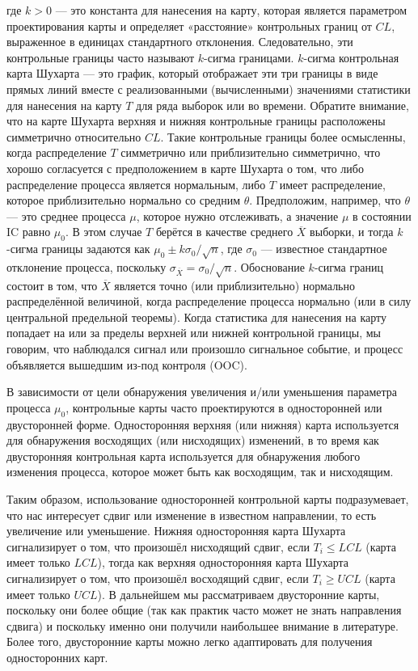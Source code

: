 где \(k > 0\) — это константа для нанесения на карту, которая является параметром проектирования карты и определяет «расстояние» контрольных границ от \(CL\), выраженное в единицах стандартного отклонения. Следовательно, эти контрольные границы часто называют \(k\)-сигма границами. \(k\)-сигма контрольная карта Шухарта — это график, который отображает эти три границы в виде прямых линий вместе с реализованными (вычисленными) значениями статистики для нанесения на карту \(T\) для ряда выборок или во времени. Обратите внимание, что на карте Шухарта верхняя и нижняя контрольные границы расположены симметрично относительно \(CL\). Такие контрольные границы более осмысленны, когда распределение \(T\) симметрично или приблизительно симметрично, что хорошо согласуется с предположением в карте Шухарта о том, что либо распределение процесса является нормальным, либо \(T\) имеет распределение, которое приблизительно нормально со средним \(\theta\). Предположим, например, что \(\theta\) — это среднее процесса \(\mu\), которое нужно отслеживать, а значение \(\mu\) в состоянии IC равно \(\mu_0\). В этом случае \(T\) берётся в качестве среднего \(\overline{X}\) выборки, и тогда \(k\)-сигма границы задаются как \(\mu_0 \pm k\sigma_0/\sqrt{n}\), где \(\sigma_0\) — известное стандартное отклонение процесса, поскольку \(\sigma_{\overline{X}} = \sigma_0/\sqrt{n}\). Обоснование \(k\)-сигма границ состоит в том, что \(\overline{X}\) является точно (или приблизительно) нормально распределённой величиной, когда распределение процесса нормально (или в силу центральной предельной теоремы). Когда статистика для нанесения на карту попадает на или за пределы верхней или нижней контрольной границы, мы говорим, что наблюдался сигнал или произошло сигнальное событие, и процесс объявляется вышедшим из-под контроля (OOC).

В зависимости от цели обнаружения увеличения и/или уменьшения параметра процесса \(\mu_0\), контрольные карты часто проектируются в односторонней или двусторонней форме. Односторонняя верхняя (или нижняя) карта используется для обнаружения восходящих (или нисходящих) изменений, в то время как двусторонняя контрольная карта используется для обнаружения любого изменения процесса, которое может быть как восходящим, так и нисходящим.

Таким образом, использование односторонней контрольной карты подразумевает, что нас интересует сдвиг или изменение в известном направлении, то есть увеличение или уменьшение. Нижняя односторонняя карта Шухарта сигнализирует о том, что произошёл нисходящий сдвиг, если \(T_i \leq LCL\) (карта имеет только \(LCL\)), тогда как верхняя односторонняя карта Шухарта сигнализирует о том, что произошёл восходящий сдвиг, если \(T_i \geq UCL\) (карта имеет только \(UCL\)). В дальнейшем мы рассматриваем двусторонние карты, поскольку они более общие (так как практик часто может не знать направления сдвига) и поскольку именно они получили наибольшее внимание в литературе. Более того, двусторонние карты можно легко адаптировать для получения односторонних карт.

